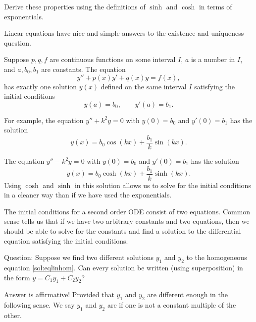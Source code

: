 \documentclass[12pt]{book}
\begin{document}
\begin{exercise}
Derive these properties using the definitions of $\sinh$
and $\cosh$ in terms of exponentials.
\end{exercise}


Linear equations have nice and simple
answers to the existence and uniqueness question.

\begin{theorem}
Suppose $p, q, f$ are continuous functions on some interval
$I$, $a$ is a number in $I$,
and $a, b_0, b_1$ are constants.
The equation
\begin{equation*}
y'' + p(x) y' + q(x) y = f(x) ,
\end{equation*}
has exactly one solution $y(x)$ defined on the same interval $I$ satisfying the initial conditions
\begin{equation*}
y(a) = b_0 , \qquad y'(a) = b_1 .
\end{equation*}
\end{theorem}

For example, the equation $y'' + k^2 y = 0$ with $y(0) = b_0$ and $y'(0) = b_1$
has the solution
\begin{equation*}
y(x) = b_0 \cos (kx) + \frac{b_1}{k} \sin (kx) .
\end{equation*}

The equation $y'' - k^2 y = 0$ with $y(0) = b_0$ and $y'(0) = b_1$
has the solution
\begin{equation*}
y(x) = b_0 \cosh (kx) + \frac{b_1}{k} \sinh (kx) .
\end{equation*}
Using $\cosh$ and $\sinh$ in this solution allows us to solve for
the initial conditions
in a cleaner way
than if we have used the exponentials.

\medskip

The initial conditions for a second order ODE consist of two
equations.  Common sense tells us that
if we have two arbitrary constants and two equations, then we should 
be able to solve
for the constants and find a solution to the differential equation
satisfying the initial conditions.

Question: Suppose we find two different solutions $y_1$ and $y_2$ to the
homogeneous equation \eqref{sol:eqlinhom}.  Can every solution
be written (using superposition) in the form
$y = C_1 y_1 + C_2 y_2$?

Answer is affirmative!  Provided that $y_1$ and $y_2$ are different enough in
the following sense.  We say $y_1$ and $y_2$ are \emph{} if one is not a constant multiple of the other.
\end{document}
